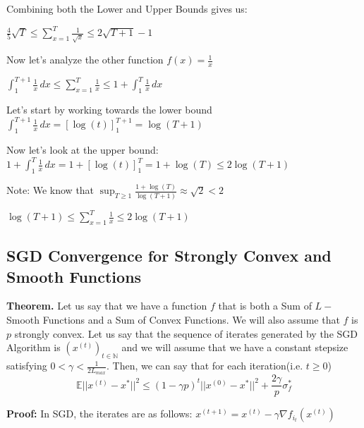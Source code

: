 Combining both the Lower and Upper Bounds gives us: \newline 


$\frac{4}{5} \sqrt{T} \leq \sum_{x=1}^{T} \frac{1}{\sqrt{x}} \leq 2 \sqrt{T + 1} - 1 $ \newline 

Now let's analyze the other function $f(x) = \frac{1}{x}$ \newline 

$\int_{1}^{T + 1} \frac{1}{x} \,dx \leq \sum_{x=1}^{T} \frac{1}{x} \leq 1 + \int_{1}^{T} \frac{1}{x} \,dx$ \newline 

Let's start by working towards the lower bound \newline 
$\int_{1}^{T + 1} \frac{1}{x} \,dx = [\log(t)]_1^{T + 1} = \log(T + 1)$ \newline 

Now let's look at the upper bound: \newline 
$1 + \int_{1}^{T} \frac{1}{x} \,dx = 1 + [\log(t)]_1^{T} = 1 + \log(T) \leq 2 \log(T + 1)$

Note: We know that $\sup_{T \geq 1} \frac{1 + \log(T)}{\log(T + 1)} \approx \sqrt{2} < 2$ \newline

$\log(T + 1) \leq \sum_{x=1}^{T} \frac{1}{x} \leq 2 \log(T + 1)$ \newline 



\subsection{SGD Convergence for Strongly Convex and Smooth Functions}
\noindent \textbf{Theorem.} Let us say that we have a function $f$ that is both a Sum of $L-$Smooth Functions and a Sum of Convex Functions. We will also assume that $f$ is $p$ strongly convex. Let us say that the sequence of iterates generated by the SGD Algorithm is $(x^{(t)})_{t \in \mathbb{N}}$ and we will assume that we have a constant stepsize satisfying $0 < \gamma < \frac{1}{2L_{max}}$. Then, we can say that for each iteration(i.e. $t \geq 0$) 
\begin{equation}
    \mathbb{E}||x^{(t)} - x^*||^2 \leq (1 - \gamma p)^t ||x^{(0)} - x^*||^2 + \frac{2 \gamma}{p} \sigma_f^*
\end{equation}

\noindent \textbf{Proof:} \newline 
\noindent In SGD, the iterates are as follows: $x^{(t + 1)}  = x^{(t)} - \gamma \nabla f_{i_t}(x^{(t)})$ \newline 


